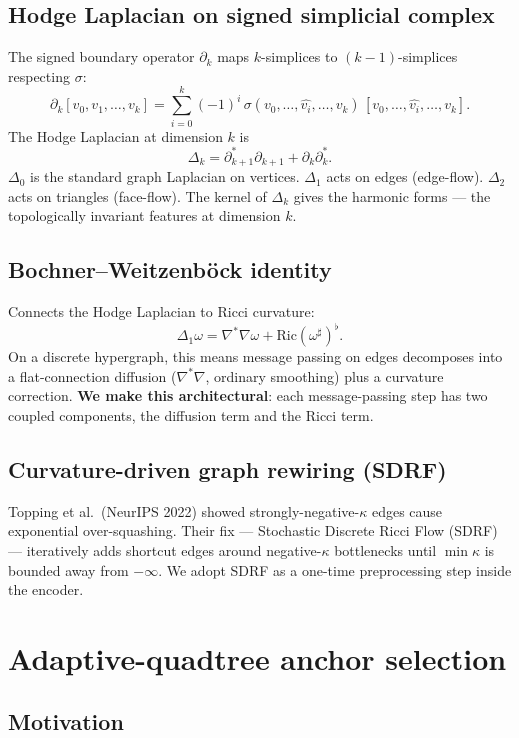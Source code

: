 \documentclass[11pt,a4paper]{article}
\newcommand{\sig}{\ensuremath{\sigma}}
\begin{document}
\subsection{Hodge Laplacian on signed simplicial complex}

The signed boundary operator $\partial_k$ maps $k$-simplices to
$(k{-}1)$-simplices respecting $\sig$:
\[
\partial_k [v_0, v_1, \ldots, v_k] = \sum_{i = 0}^{k} (-1)^i \,
  \sig(v_0, \ldots, \hat{v_i}, \ldots, v_k) \,
  [v_0, \ldots, \hat{v_i}, \ldots, v_k].
\]
The Hodge Laplacian at dimension $k$ is
\[
\Delta_k = \partial_{k+1}^* \partial_{k+1} + \partial_k \partial_k^*.
\]
$\Delta_0$ is the standard graph Laplacian on vertices. $\Delta_1$
acts on edges (edge-flow). $\Delta_2$ acts on triangles (face-flow).
The kernel of $\Delta_k$ gives the harmonic forms --- the
topologically invariant features at dimension $k$.

\subsection{Bochner--Weitzenböck identity}

Connects the Hodge Laplacian to Ricci curvature:
\[
\Delta_1 \omega = \nabla^* \nabla \omega + \mathrm{Ric}(\omega^\sharp)^\flat.
\]
On a discrete hypergraph, this means message passing on edges decomposes
into a flat-connection diffusion ($\nabla^* \nabla$, ordinary smoothing)
plus a curvature correction. \textbf{We make this architectural}:
each message-passing step has two coupled components, the diffusion
term and the Ricci term.

\subsection{Curvature-driven graph rewiring (SDRF)}

Topping et al.\ (NeurIPS 2022) showed strongly-negative-$\kappa$ edges
cause exponential over-squashing. Their fix --- Stochastic Discrete
Ricci Flow (SDRF) --- iteratively adds shortcut edges around negative-$\kappa$
bottlenecks until $\min \kappa$ is bounded away from $-\infty$.
We adopt SDRF as a one-time preprocessing step inside the encoder.

\section{Adaptive-quadtree anchor selection}

\subsection{Motivation}
\end{document}
